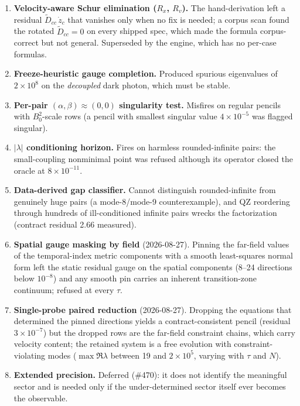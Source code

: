 \begin{enumerate}
  \item \textbf{Velocity-aware Schur elimination ($R_x$, $R_v$).} The
    hand-derivation left a residual $\tilde D_{cc}\,\dot z_c$ that
    vanishes only when no fix is needed; a corpus scan found the rotated
    $\tilde D_{cc} = 0$ on every shipped spec, which made the formula
    corpus-correct but not general. Superseded by the engine, which has
    no per-case formulas.
  \item \textbf{Freeze-heuristic gauge completion.} Produced spurious
    eigenvalues of $2\times10^{8}$ on the \emph{decoupled} dark photon,
    which must be stable.
  \item \textbf{Per-pair $(\alpha,\beta)\approx(0,0)$ singularity test.}
    Misfires on regular pencils with $B_0^2$-scale rows (a pencil with
    smallest singular value $4\times10^{-5}$ was flagged singular).
  \item \textbf{$|\lambda|$ conditioning horizon.} Fires on harmless
    rounded-infinite pairs: the small-coupling nonminimal point was
    refused although its operator closed the oracle at $8\times10^{-11}$.
  \item \textbf{Data-derived gap classifier.} Cannot distinguish
    rounded-infinite from genuinely huge pairs (a mode-8/mode-9
    counterexample), and QZ reordering through hundreds of
    ill-conditioned infinite pairs wrecks the factorization (contract
    residual 2.66 measured).
  \item \textbf{Spatial gauge masking by field} (2026-08-27). Pinning the
    far-field values of the temporal-index metric components with a
    smooth least-squares normal form left the static residual gauge on
    the spatial components (8--24 directions below $10^{-8}$) and any
    smooth pin carries an inherent transition-zone continuum; refused at
    every $\tau$.
  \item \textbf{Single-probe paired reduction} (2026-08-27). Dropping the
    equations that determined the pinned directions yields a
    contract-consistent pencil (residual $3\times10^{-7}$) but the
    dropped rows are the far-field constraint chains, which carry
    velocity content; the retained system is a free evolution with
    constraint-violating modes ($\max\Re\lambda$ between 19 and
    $2\times10^{5}$, varying with $\tau$ and $N$).
  \item \textbf{Extended precision.} Deferred (\#470): it does not
    identify the meaningful sector and is needed only if the
    under-determined sector itself ever becomes the observable.
\end{enumerate}

